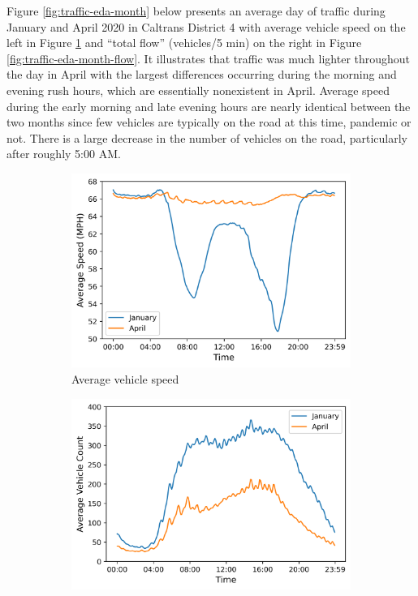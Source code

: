 \documentclass{article}
\begin{document}
Figure \ref{fig:traffic-eda-month} below presents an average day of traffic during January and April 2020 in Caltrans District 4 with average vehicle speed on the left in Figure \ref{fig:traffic-eda-month-speed} and ``total flow'' (vehicles/5 min) on the right in Figure \ref{fig:traffic-eda-month-flow}. It illustrates that traffic was much lighter throughout the day in April with the largest differences occurring during the morning and evening rush hours, which are essentially nonexistent in April. Average speed during the early morning and late evening hours are nearly identical between the two months since few vehicles are typically on the road at this time, pandemic or not. There is a large decrease in the number of vehicles on the road, particularly after roughly 5:00 AM.

\begin{figure}[hbt!]
    \centering
    \begin{subfigure}[b]{0.48\textwidth}
        \centering
        \includegraphics[width=\textwidth]{images/traffic_speed.png}
        \caption{Average vehicle speed}
        \label{fig:traffic-eda-month-speed}
    \end{subfigure}
    \hfill
    \begin{subfigure}[b]{0.48\textwidth}
        \centering
        \includegraphics[width=\textwidth]{images/traffic_flow.png}

\end{subfigure}
\end{figure}
\end{document}

